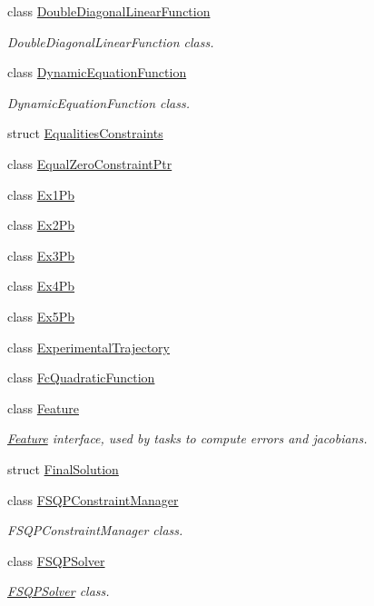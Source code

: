 \begin{DoxyCompactItemize}
class \hyperlink{classocra_1_1DoubleDiagonalLinearFunction}{Double\+Diagonal\+Linear\+Function}
\begin{DoxyCompactList}\small\item\em Double\+Diagonal\+Linear\+Function class. \end{DoxyCompactList}\item 
class \hyperlink{classocra_1_1DynamicEquationFunction}{Dynamic\+Equation\+Function}
\begin{DoxyCompactList}\small\item\em Dynamic\+Equation\+Function class. \end{DoxyCompactList}\item 
struct \hyperlink{structocra_1_1EqualitiesConstraints}{Equalities\+Constraints}
\item 
class \hyperlink{classocra_1_1EqualZeroConstraintPtr}{Equal\+Zero\+Constraint\+Ptr}
\item 
class \hyperlink{classocra_1_1Ex1Pb}{Ex1\+Pb}
\item 
class \hyperlink{classocra_1_1Ex2Pb}{Ex2\+Pb}
\item 
class \hyperlink{classocra_1_1Ex3Pb}{Ex3\+Pb}
\item 
class \hyperlink{classocra_1_1Ex4Pb}{Ex4\+Pb}
\item 
class \hyperlink{classocra_1_1Ex5Pb}{Ex5\+Pb}
\item 
class \hyperlink{classocra_1_1ExperimentalTrajectory}{Experimental\+Trajectory}
\item 
class \hyperlink{classocra_1_1FcQuadraticFunction}{Fc\+Quadratic\+Function}
\item 
class \hyperlink{classocra_1_1Feature}{Feature}
\begin{DoxyCompactList}\small\item\em \hyperlink{classocra_1_1Feature}{Feature} interface, used by tasks to compute errors and jacobians. \end{DoxyCompactList}\item 
struct \hyperlink{structocra_1_1FinalSolution}{Final\+Solution}
\item 
class \hyperlink{classocra_1_1FSQPConstraintManager}{F\+S\+Q\+P\+Constraint\+Manager}
\begin{DoxyCompactList}\small\item\em F\+S\+Q\+P\+Constraint\+Manager class. \end{DoxyCompactList}\item 
class \hyperlink{classocra_1_1FSQPSolver}{F\+S\+Q\+P\+Solver}
\begin{DoxyCompactList}\small\item\em \hyperlink{classocra_1_1FSQPSolver}{F\+S\+Q\+P\+Solver} class. \end{DoxyCompactList}\item 

\end{DoxyCompactItemize}
